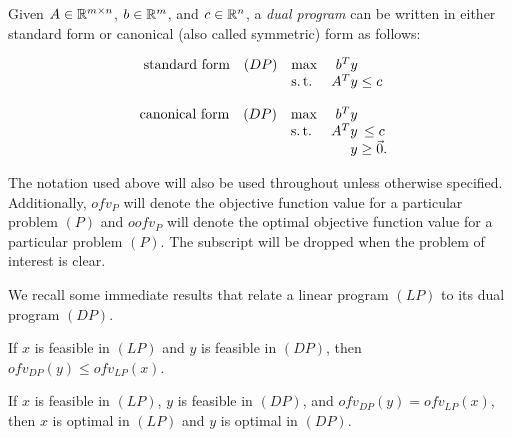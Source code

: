 \begin{defn}
    \label{defn:dual-program}
    Given $A \in \mathbb R^{m \times n}$, $b \in \mathbb R^m$, and $c \in \mathbb R^n$, a \textit{dual program} can be written in either standard form or canonical (also called symmetric) form as follows:
    \begin{multicols}{2}
        \noindent
        \begin{equation*}
        \begin{array}{lllr@{}c@{}}
        \text{standard form} 
            & (DP)  & \max  & b^T y &           \\
            &       & \st   & A^T y & {}\le c   \\
        \end{array}
        \end{equation*}
        
        \noindent
        \begin{equation*}
        \begin{array}{lllr@{}c@{}}
        \text{canonical form} 
            & (DP)  & \max  & b^T y &           \\
            &       & \st   & A^T y & {}\le c   \\
            &       &       &  y    & {}\ge \Vec{0}.
        \end{array}
        \end{equation*}
        \end{multicols}
\end{defn}

The notation used above will also be used throughout unless otherwise specified. Additionally, $ofv_P$ will denote the objective function value for a particular problem $(P)$ and $oofv_P$ will denote the optimal objective function value for a particular problem $(P)$. The subscript will be dropped when the problem of interest is clear.

We recall some immediate results that relate a linear program $(LP)$ to its dual program $(DP)$.

\begin{thm}
    \label{thm:weak-duality-LP}
    If $x$ is feasible in $(LP)$ and $y$ is feasible in $(DP)$, then $ofv_{DP}(y) \le ofv_{LP}(x)$.
\end{thm}

\begin{thm}
    \label{thm:supervisor-principle-LP}
    If $x$ is feasible in $(LP)$, $y$ is feasible in $(DP)$, and $ofv_{DP}(y) = ofv_{LP}(x)$, then $x$ is optimal in $(LP)$ and $y$ is optimal in $(DP)$.
\end{thm}

